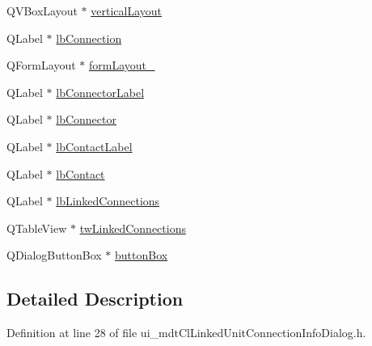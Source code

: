 \begin{DoxyCompactItemize}
\item 
Q\-V\-Box\-Layout $\ast$ \hyperlink{class_ui__mdt_cl_linked_unit_connection_info_dialog_a2a3dc08abd1fcf94feb996ea00a7f3c2}{vertical\-Layout}
\item 
Q\-Label $\ast$ \hyperlink{class_ui__mdt_cl_linked_unit_connection_info_dialog_a5c7208916d5f34f4dd57c28635407700}{lb\-Connection}
\item 
Q\-Form\-Layout $\ast$ \hyperlink{class_ui__mdt_cl_linked_unit_connection_info_dialog_acc2eeb39df02089837132406e974c700}{form\-Layout\-\_}
\item 
Q\-Label $\ast$ \hyperlink{class_ui__mdt_cl_linked_unit_connection_info_dialog_ae35ea29ffdf97d86d7f0c1598cc24120}{lb\-Connector\-Label}
\item 
Q\-Label $\ast$ \hyperlink{class_ui__mdt_cl_linked_unit_connection_info_dialog_ac0273b35f8bfb5ebc364b5cd75dbec1e}{lb\-Connector}
\item 
Q\-Label $\ast$ \hyperlink{class_ui__mdt_cl_linked_unit_connection_info_dialog_a90645a3d063ec19330e5ec8a9165c03e}{lb\-Contact\-Label}
\item 
Q\-Label $\ast$ \hyperlink{class_ui__mdt_cl_linked_unit_connection_info_dialog_ad5fb295a95cbf24db4940e8042c9ccdf}{lb\-Contact}
\item 
Q\-Label $\ast$ \hyperlink{class_ui__mdt_cl_linked_unit_connection_info_dialog_a16e4b5a99cbaee675ab2dee9141b6bd9}{lb\-Linked\-Connections}
\item 
Q\-Table\-View $\ast$ \hyperlink{class_ui__mdt_cl_linked_unit_connection_info_dialog_a3a76fb485a339f8a47a4a148f5534f42}{tw\-Linked\-Connections}
\item 
Q\-Dialog\-Button\-Box $\ast$ \hyperlink{class_ui__mdt_cl_linked_unit_connection_info_dialog_a5cabb5abc0be0397d820767dfc88faa4}{button\-Box}
\end{DoxyCompactItemize}


\subsection{Detailed Description}


Definition at line 28 of file ui\-\_\-mdt\-Cl\-Linked\-Unit\-Connection\-Info\-Dialog.\-h.




